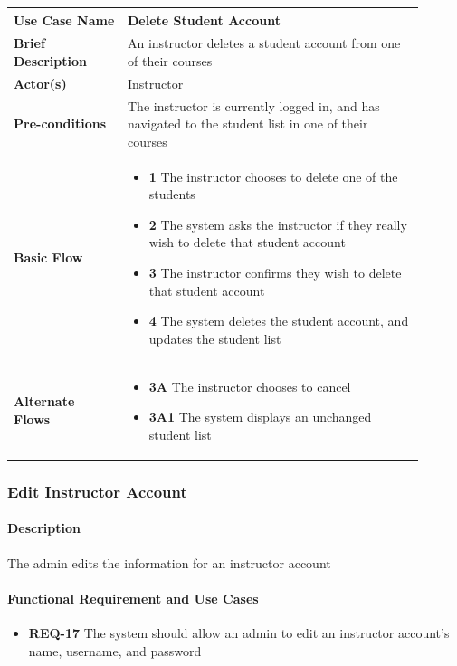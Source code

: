 \documentclass{article}
\begin{document}
\begin{tabular}{| p{0.25\linewidth} | p{0.65\linewidth} |}
  \hline
  \textbf{Use Case Name} & Delete Student Account\\
  \hline
  \textbf{Brief Description} & An instructor deletes a student account from one of their courses\\
  \hline
  \textbf{Actor(s)} & Instructor \\
  \hline
  \textbf{Pre-conditions} & The instructor is currently logged in, and has navigated to the student list in one of their courses\\
  \hline
  \textbf{Basic Flow} & \begin{itemize}
    \item[] \textbf{1} The instructor chooses to delete one of the students
    \item[] \textbf{2} The system asks the instructor if they really wish to delete that student account
    \item[] \textbf{3} The instructor confirms they wish to delete that student account
    \item[] \textbf{4} The system deletes the student account, and updates the student list
  \end{itemize}\\
  \hline
  \textbf{Alternate Flows} & \begin{itemize}
    \item[] \textbf{3A} The instructor chooses to cancel
    \item[] \textbf{3A1} The system displays an unchanged student list
  \end{itemize}\\
  \hline
\end{tabular}

\subsubsection{Edit Instructor Account}

\paragraph{Description} The admin edits the information for an instructor account

\paragraph{Functional Requirement and Use Cases}

\begin{itemize}
  \item \textbf{REQ-17} The system should allow an admin to edit an instructor account's name, username, and password
\end{itemize}
\end{document}
